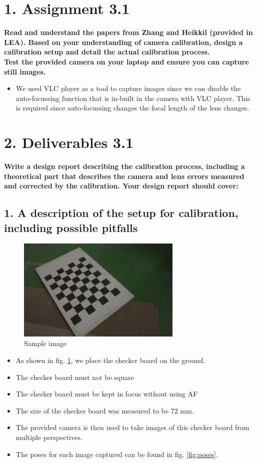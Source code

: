 \section*{1. Assignment 3.1}
\textbf{Read and understand the papers from Zhang and Heikkil (provided in LEA). Based on your understanding of camera calibration, design a calibration setup and detail the actual calibration process. \\
Test the provided camera on your laptop and ensure you can capture still images.}

\begin{itemize}
\item We used VLC player as a tool to capture images since we can disable the auto-focussing function that is in-built in the camera with VLC player. This is required since auto-focussing changes the focal length of the lens changes.
\end{itemize}

\section*{2. Deliverables 3.1}
\textbf{Write a design report describing the calibration process, including a theoretical part that describes the camera and lens errors measured and corrected by the calibration. Your design report should cover:}

\subsection*{1. A description of the setup for calibration, including possible pitfalls}
\begin{figure}[H]
\begin{center}
\includegraphics[width=0.7\textwidth]{data/1.jpg}
\caption{Sample image}
\label{fig:sample}
\end{center}
\end{figure}
\begin{itemize}
\item As shown in fig. \ref{fig:sample}, we place the checker board on the ground.
\item The checker board must not be square
\item The checker board must be kept in focus without using AF
\item The size of the checker board was measured to be $72$ mm.
\item The provided camera is then used to take images of this checker board from multiple perspectives.
\item The poses for each image captured can be found in fig. \ref{fig:poses}.
\end{itemize}

